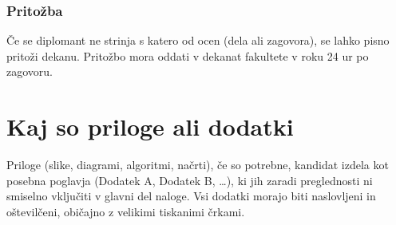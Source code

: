 \documentclass[12pt,a4paper,openany]{book}
\begin{document}
\subsection{Pritožba}
Če se diplomant ne strinja s katero od ocen (dela ali zagovora), se lahko pisno pritoži dekanu. Pritožbo mora oddati v dekanat fakultete v roku
24 ur po zagovoru. 

\newpage


\appendix


\chapter{Kaj so priloge ali dodatki}

Priloge (slike, diagrami, algoritmi, načrti), 
če so potrebne, kandidat izdela kot posebna poglavja (Dodatek A, Dodatek B, \ldots), ki jih zaradi preglednosti ni smiselno vključiti v glavni
del naloge. Vsi dodatki morajo biti naslovljeni in oštevilčeni, običajno z velikimi tiskanimi črkami. 

\newpage

\listoffigures

\newpage

\listoftables




\newpage


\label{stran_literatura}
 
\end{document}
